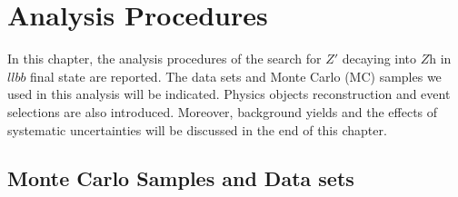 
\chapter{Analysis Procedures}

In this chapter, the analysis procedures of the search for $Z'$ decaying into $Z$h in $llbb$ final state are reported. The data sets and Monte Carlo (MC) samples we used in this analysis will be indicated. Physics objects reconstruction and event selections are also introduced. Moreover, background yields and the effects of systematic uncertainties will be discussed in the end of this chapter.

\section{Monte Carlo Samples and Data sets}

